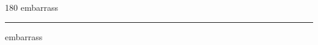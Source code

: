 
\begin{frame}
\begin{center}
\begin{turn}{180}
{\fontsize{2.5cm}{1em}\selectfont embarrass}
\end{turn}
\vspace{1em}\par  
\hrule
\vspace{1em}\par  
{\fontsize{2.5cm}{1em}\selectfont embarrass}
\end{center}
\end{frame}
